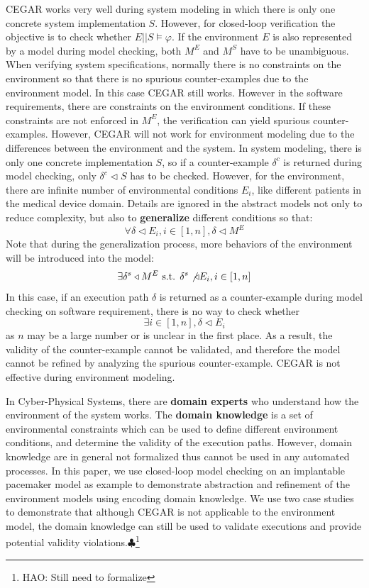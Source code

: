 \documentclass{llncs}
\newcommand{\Hao}[1]{$\clubsuit$\footnote{HAO: #1}}
\begin{document}
CEGAR works very well during system modeling in which there is only one concrete system implementation $S$. However, for closed-loop verification the objective is to check whether $E||S\models\varphi$. If the environment $E$ is also represented by a model during model checking, both $M^E$ and $M^S$ have to be unambiguous. When verifying system specifications, normally there is no constraints on the environment so that there is no spurious counter-examples due to the environment model. In this case CEGAR still works. However in the software requirements, there are constraints on the environment conditions. If these constraints are not enforced in $M^E$, the verification can yield spurious counter-examples. However, CEGAR will not work for environment modeling due to the differences between the environment and the system. In system modeling, there is only one concrete implementation $S$, so if a counter-example $\delta^c$ is returned during model checking, only $\delta^c\triangleleft S$ has to be checked. However, for the environment, there are infinite number of environmental conditions $E_i$, like different patients in the medical device domain. Details are ignored in the abstract models not only to reduce complexity, but also to \textbf{generalize} different conditions so that:
$$\forall \delta\triangleleft E_i, i\in [1,n],\delta\triangleleft M^E$$
Note that during the generalization process, more behaviors of the environment will be introduced into the model: 
$$\exists\delta^s\triangleleft M^E \text{ s.t. } \delta^s\not\triangleleft E_i, i\in [1,n]$$
In this case, if an execution path $\delta$ is returned as a counter-example during model checking on software requirement, there is no way to check whether 
$$\exists i\in[1,n],\delta\triangleleft E_i$$ 
as $n$ may be a large number or is unclear in the first place. As a result, the validity of the counter-example cannot be validated, and therefore the model cannot be refined by analyzing the spurious counter-example. CEGAR is not effective during environment modeling.

In Cyber-Physical Systems, there are \textbf{domain experts} who understand how the environment of the system works. The \textbf{domain knowledge} is a set of environmental constraints which can be used to define different environment conditions, and determine the validity of the execution paths. However, domain knowledge are in general not formalized thus cannot be used in any automated processes. In this paper, we use closed-loop model checking on an implantable pacemaker model as example to demonstrate abstraction and refinement of the environment models using encoding domain knowledge. We use two case studies to demonstrate that although CEGAR is not applicable to the environment model, the domain knowledge can still be used to validate executions and provide potential validity violations.\Hao{Still need to formalize}
\end{document}

